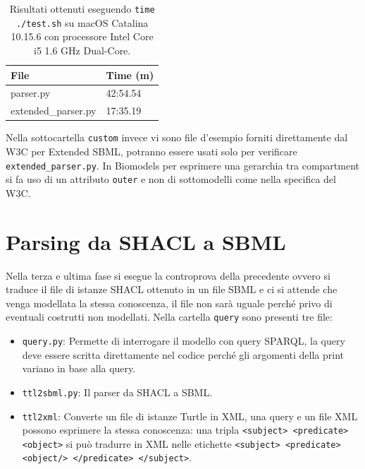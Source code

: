 \documentclass{article}
\begin{document}
\begin{table}[h!t] 
    \centering
    \begin{longtable}{p{}p{}}
        \textbf{File} & \textbf{Time (m)} \\
        \hline
        parser.py & 42:54.54 \\
        extended\_parser.py & 17:35.19 \\
        \hline
    \end{longtable}
    \caption{Risultati ottenuti eseguendo \texttt{time ./test.sh} su macOS Catalina 10.15.6 con processore Intel Core i5 1.6 GHz Dual-Core.}
    \label{tab:performance}
\end{table}

Nella sottocartella \texttt{custom} invece vi sono file d'esempio forniti direttamente dal W3C per Extended SBML, potranno essere usati solo per verificare \texttt{extended\_parser.py}. In Biomodels per esprimere una gerarchia tra compartment si fa uso di un attributo \texttt{outer} e non di sottomodelli come nella specifica del W3C.

\section{Parsing da SHACL a SBML}
Nella terza e ultima fase si esegue la controprova della precedente ovvero si traduce il file di istanze SHACL ottenuto in un file SBML e ci si attende che venga modellata la stessa conoscenza, il file non sarà uguale perché privo di eventuali costrutti non modellati. Nella cartella \texttt{query} sono presenti tre file:

\begin{itemize}
    \item \texttt{query.py}: Permette di interrogare il modello con query SPARQL, la query deve essere scritta direttamente nel codice perché gli argomenti della print variano in base alla query.
    \item \texttt{ttl2sbml.py}: Il parser da SHACL a SBML.
    \item \texttt{ttl2xml}: Converte un file di istanze Turtle in XML, una query e un file XML possono esprimere la stessa conoscenza: una tripla \texttt{<subject> <predicate> <object>} si può tradurre in XML nelle etichette \texttt{<subject> <predicate> <object/> </predicate> </subject>}.
\end{itemize}
\end{document}
